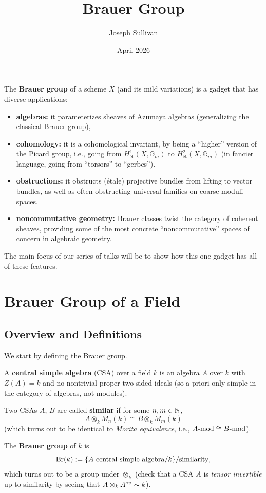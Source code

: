 \documentclass[12pt]{article}
\title{Brauer Group}
\author{Joseph Sullivan}
\date{April 2026}
\newcommand{\et}{\text{\'{e}t}}
\newcommand{\G}{\mathbb{G}}
\newcommand{\Br}{\mathrm{Br}}
\begin{document}
\maketitle
\tableofcontents

The \textbf{Brauer group} of a scheme $X$ (and its mild variations) is a gadget that has diverse applications:
\begin{itemize}
    \item \textbf{algebras:} it parameterizes sheaves of Azumaya algebras (generalizing the classical Brauer group),
    \item \textbf{cohomology:} it is a cohomological invariant, by being a ``higher'' version of the Picard group, i.e., going from $H^1_{\et}(X,\G_m)$ to $H^2_\et(X,\G_m)$ (in fancier language, going from ``torsors'' to ``gerbes'').
    \item \textbf{obstructions:} it obstructs (\'etale) projective bundles from lifting to vector bundles, as well as often obstructing universal families on coarse moduli spaces.
    \item \textbf{noncommutative geometry:} Brauer classes twist the category of coherent sheaves, providing some of the most concrete ``noncommutative'' spaces of concern in algebraic geometry.
\end{itemize}

The main focus of our series of talks will be to show how this one gadget has all of these features.

\section{Brauer Group of a Field}

\subsection{Overview and Definitions}

We start by defining the Brauer group.

\begin{defn}
    A \textbf{central simple algebra} (CSA) over a field $k$ is an algebra $A$ over $k$ with $Z(A)=k$ and no nontrivial proper two-sided ideals (so a-priori only simple in the category of algebras, not modules).

    Two CSAs $A$, $B$ are called \textbf{similar} if for some $n,m\in \mathbb{N}$,
    \[A \otimes_k M_n(k) \cong B \otimes_k M_m(k)\]
    (which turns out to be identical to \textit{Morita equivalence}, i.e., $A\text{-}\mathrm{mod} \cong B\text{-}\mathrm{mod}$).

    The \textbf{Brauer group} of $k$ is
    \[\Br(k) \defeq \{A \text{ central simple algebra}/k\} / \text{similarity},\]
    which turns out to be a group under $\otimes_k$ (check that a CSA $A$ is \textit{tensor invertible} up to similarity by seeing that $A\otimes_k A^{\mathrm{op}} \sim k$).
\end{defn}
\end{document}
